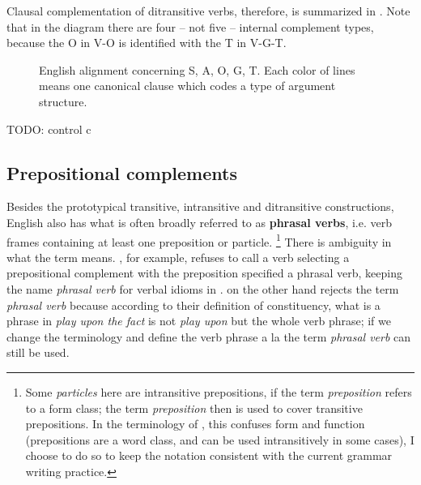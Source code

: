 \documentclass[UTF8, a4paper, oneside, scheme=plain, 12pt]{ctexbook}
\newcommand*{\citepage}[1]{p.~{#1}}
\newcommand*{\concept}[1]{\textbf{#1}}
\newcommand*{\term}[1]{\emph{#1}}
\newcommand{\form}[1]{\emph{#1}}
\begin{document}
Clausal complementation of ditransitive verbs, therefore, is summarized in .
Note that in the diagram there are four -- not five -- internal complement types,
because the O in V-O is identified with the T in V-G-T.

\begin{figure}[H]
    \centering
    
    \caption{English alignment concerning S, A, O, G, T. Each color of lines means one canonical clause which codes a type of argument structure.}
    \label{fig:ditransitive-gt}
\end{figure}

TODO: control c

\subsection{Prepositional complements}\label{sec:vp.valence.verb-prep-obj}

Besides the prototypical transitive, intransitive and ditransitive constructions,
English also has what is often broadly referred to as \concept{phrasal verbs}, 
i.e. verb frames containing at least one preposition or particle.%
\footnote{
    Some \term{particles} here are intransitive prepositions, 
    if the term \term{preposition} refers to a form class; 
    the term \term{preposition} then is used to cover transitive prepositions.
    In the terminology of \citet{cgel}, 
    this confuses form and function 
    (prepositions are a word class, 
    and can be used intransitively in some cases),
    I choose to do so to keep the notation consistent with 
    the current grammar writing practice.
}
There is ambiguity in what the term means.
\citet[\citepage{289}]{dixon2005semantic}, for example,
refuses to call a verb selecting a prepositional complement with the preposition specified
a phrasal verb,
keeping the name \term{phrasal verb} for verbal idioms in \citet{cgel}.
\citet{cgel} on the other hand rejects the term \term{phrasal verb} 
because according to their definition of constituency,
what is a phrase in \form{play upon the fact} is not \form{play upon} 
but the whole verb phrase; 
if we change the terminology and define the verb phrase a la 
\citet[\citepage{41}]{dixon2005semantic}
the term \term{phrasal verb} can still be used.
\end{document}
